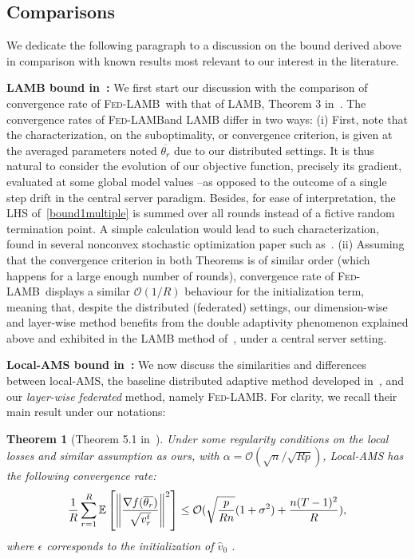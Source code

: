 \documentclass[11pt]{article}
\newtheorem{Theorem}{Theorem}
\newcommand{\beq}{\begin{equation}}
\newcommand{\eeq}{\end{equation}}
\def\EE{\mathbb{E}}
\newcommand{\algo}{\textsc{Fed-LAMB}}
\begin{document}
\subsection{Comparisons}

We dedicate the following paragraph to a discussion on the bound derived above in comparison with known results most relevant to our interest in the literature.

\vspace{0.05in}
\textbf{LAMB bound in~\citet{you2019large}: }
We first start our discussion with the comparison of convergence rate of \algo\ with that of LAMB, Theorem 3 in~\citet{you2019large}. 
The convergence rates of \algo and LAMB differ in two ways: 
(i) First, note that the characterization, on the suboptimality, or convergence criterion, is given at the averaged parameters noted $\overline{\theta_r}$ due to our distributed settings. 
It is thus natural to consider the evolution of our objective function, precisely its gradient, evaluated at some global model values --as opposed to the outcome of a single step drift in the central server paradigm. 
Besides, for ease of interpretation, the LHS of~\eqref{bound1multiple} is summed over all rounds instead of a fictive random termination point. A simple calculation would lead to such characterization, found in several nonconvex stochastic optimization paper such as~\cite{ghadimi2013stochastic}.
(ii)  Assuming that the convergence criterion in both Theorems is of similar order (which happens for a large enough number of rounds), convergence rate of \algo\ displays a similar $\mathcal{O}(1/R)$ behaviour for the initialization term, meaning that, despite the distributed (federated) settings, our dimension-wise and layer-wise method benefits from the double adaptivity phenomenon explained above and exhibited in the LAMB method of~\citep{you2019large}, under a central server setting.


\vspace{0.05in}
\textbf{Local-AMS bound in~\citet{chen2020toward}: }
We now discuss the similarities and differences between local-AMS, the baseline distributed adaptive method developed in~\citet{chen2020toward}, and our \emph{layer-wise federated} method, namely \algo.
For clarity, we recall their main result under our notations:

\begin{Theorem}[Theorem 5.1 in~\citet{chen2020toward}]
Under some regularity conditions on the local losses and similar assumption as ours, with $\alpha=\mathcal O(\sqrt{n}/\sqrt{Rp})$, Local-AMS has the following convergence rate:
\beq \notag
\begin{split}
 \frac{1}{R}\sum_{r=1}^R  \EE\left[ \left\| \frac{\nabla f(\overline{\theta_r})}{\sqrt{ v_r^t}}   \right \|^2 \right]     \leq  \mathcal O( \sqrt{\frac{p}{Rn}} (1+\sigma^2) +\frac{n(T-1)^2}{R} ),
 \end{split}
\eeq
where $\epsilon$ corresponds to the initialization of $\hat v_0$ .
\end{Theorem}
\end{document}
